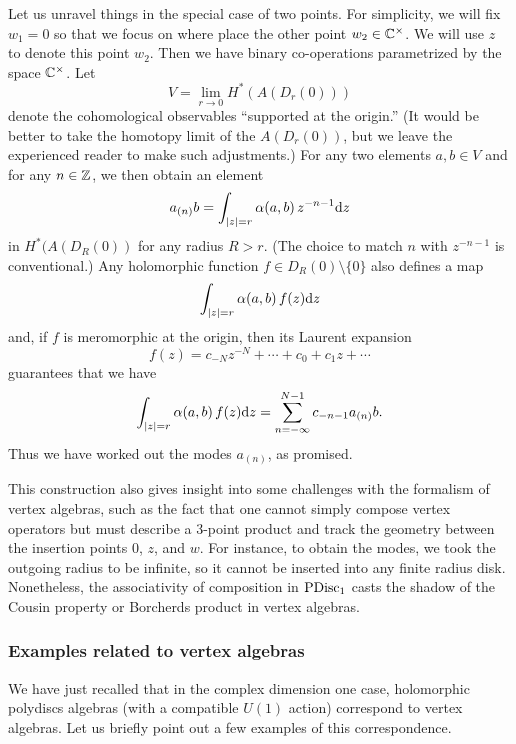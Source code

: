 \documentclass[11pt]{amsart}
\begin{document}
Let us unravel things in the special case of two points.
For simplicity, we will fix $w_1 = 0$ so that we focus on where place the other point $w_2 \in \mathbb C^\times$.
We will use $z$ to denote this point $w_2$.
Then we have binary co-operations parametrized by the space ${\mathbb{C}}^\times$.
Let 
\[
V = \lim_{r \to 0} H^*(A(D_r(0)))
\]
denote the cohomological observables ``supported at the origin.''
(It would be better to take the homotopy limit of the $A(D_r(0))$,
but we leave the experienced reader to make such adjustments.)
For any two elements $a, b \in V$ and for any $n \in \mathbb Z$,
we then obtain an element
\[
a_{(n)} b = \int_{|z| = r} \alpha(a,b)\, z^{-n-1} {\rm d} z
\]
in $H^*(A(D_R(0))$ for any radius $R > r$.
(The choice to match $n$ with $z^{-n-1}$ is conventional.)
Any holomorphic function $f \in D_R(0) \setminus \{0\}$ also defines a map
\[
\int_{|z| = r} \alpha(a,b)\, f(z) {\rm d} z 
\]
and, if $f$ is meromorphic at the origin, then its Laurent expansion
\[
f(z) = c_{-N} z^{-N} + \cdots + c_0 + c_1 z + \cdots
\]
guarantees that we have
\[
\int_{|z| = r} \alpha(a,b)\, f(z) {\rm d} z = \sum_{n=-\infty}^{N-1} c_{-n-1} a_{(n)} b.
\]
Thus we have worked out the modes $a_{(n)}$, as promised.

This construction also gives insight into some challenges with the formalism of vertex algebras,
such as the fact that one cannot simply compose vertex operators but must describe a 3-point product and track the geometry between the insertion points $0$, $z$, and $w$.
For instance, to obtain the modes, we took the outgoing radius to be infinite,
so it cannot be inserted into any finite radius disk.
Nonetheless, the associativity of composition in ${\rm PDisc}_1$ casts the shadow of the Cousin property or Borcherds product in vertex algebras.

\subsubsection{Examples related to vertex algebras} 

We have just recalled that in the complex dimension one case, holomorphic  polydiscs algebras (with a compatible $U(1)$ action) correspond to vertex algebras.
Let us briefly point out a few examples of this correspondence.
\end{document}
